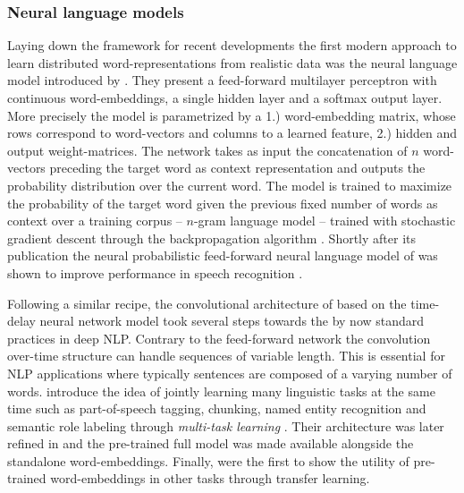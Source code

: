 \subsubsection{Neural language models}
\label{sec:NNLM}
Laying down the framework for recent developments the first modern approach to learn
distributed word-representations from realistic data
was the neural language model introduced by \cite{bengio2003neural}.
They present a feed-forward multilayer perceptron with continuous word-embeddings,
a single hidden layer and a softmax output layer.
More precisely the model is parametrized by a 1.) word-embedding matrix, 
whose rows correspond to word-vectors
and columns to a learned feature, 2.)
hidden and output weight-matrices. 
The network takes as input the concatenation of $n$ word-vectors preceding the target word as context
representation and outputs the probability distribution over the current word.
The model is trained to maximize the probability of
the target word given the previous fixed number of words as context over a training corpus
-- $n$-gram language model -- trained with stochastic gradient descent \citep{cauchy1847methode}
through the backpropagation algorithm \citep{rumelhart1985learning}.
Shortly after its publication the neural probabilistic feed-forward neural language model of  \cite{bengio2003neural} 
was shown to improve performance in speech recognition \citep{schwenk2005training}.




Following a similar recipe, the convolutional architecture of \cite{collobert2008unified}
based on the time-delay neural network model \citep{waibel1990phoneme} took several steps towards the
by now standard practices in deep NLP.
Contrary to the feed-forward network the convolution over-time structure can handle
sequences of variable length. This is essential for NLP applications where typically sentences
are composed of a varying number of words.
\cite{collobert2008unified} introduce the idea of jointly learning many linguistic tasks at the same time such as part-of-speech
tagging, chunking, named entity recognition and semantic role labeling through \emph{multi-task learning} 
\citep{caruana1997multitask}.
Their architecture was later refined in \cite{collobert2011natural} and the pre-trained
full model was made available alongside the standalone word-embeddings.
Finally, \cite{collobert2008unified} were the first to show the utility of pre-trained word-embeddings
in other tasks through transfer learning.

